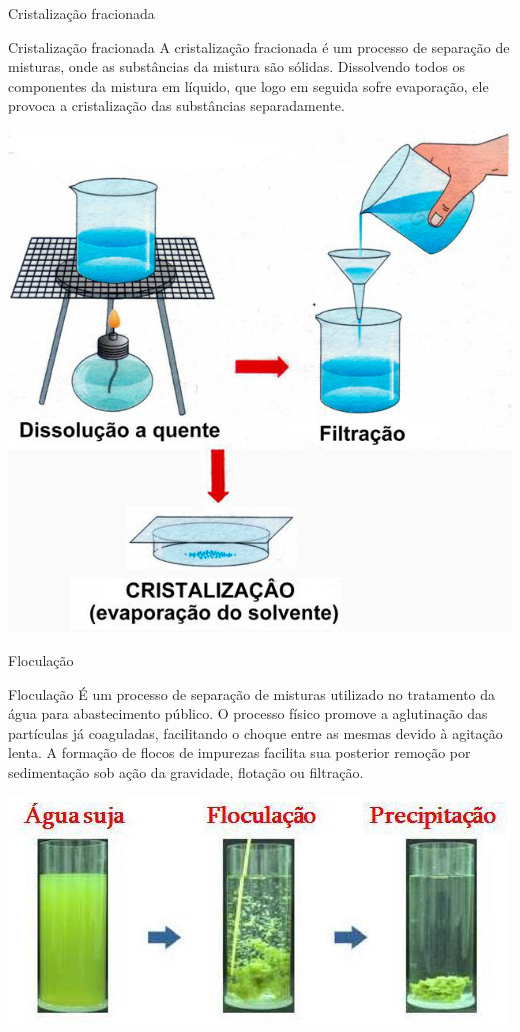 \documentclass{beamer}
\begin{document}
\begin{frame}[label={sec:org8739c44}]{Cristalização fracionada}
\begin{block}{Cristalização fracionada}
A cristalização fracionada é um processo de separação de misturas, onde as substâncias da mistura são sólidas. Dissolvendo todos os componentes da mistura em líquido, que logo em seguida sofre evaporação, ele provoca a cristalização das substâncias separadamente.

\begin{center}
\includegraphics[scale=0.2]{../img/cristalizacao_fracionada.png}
\end{center}
\end{block}
\end{frame}
\begin{frame}[label={sec:org4048b54}]{Floculação}
\begin{block}{Floculação}
É um processo de separação de misturas utilizado no tratamento da água para abastecimento público. O processo físico promove a aglutinação das partículas já coaguladas, facilitando o choque entre as mesmas devido à agitação lenta. A formação de flocos de impurezas facilita sua posterior remoção por sedimentação sob ação da gravidade, flotação ou filtração.

\begin{center}
\includegraphics[scale=0.6]{../img/floculacao.png}
\end{center}
\end{block}
\end{frame}
\end{document}
